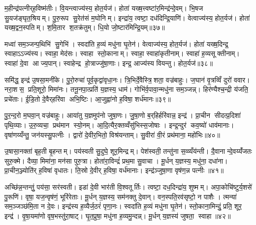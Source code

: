 म॒हीन्द्र॑पत्नीर्‌ह॒विष्म॑तीः। वि॒यन्त्वाज्य॑स्य॒ होत॒र्यज॑। होता॑ यख्ष॒त्त्वष्टा॑र॒मिन्द्र॑न्दे॒वम्। भि॒षज सु॒यज॑ङ्घृत॒श्रियम्। पु॒रु॒रूप सु॒रेत॑सं म॒घोनिम्। इन्द्रा॑य॒ त्वष्टा॒ दध॑दिन्द्रि॒याणि॑। वेत्वाज्य॑स्य॒ होत॒र्यज॑। होता॑ यख्ष॒द्वन॒स्पतिम्। श॒मि॒तार श॒तक्र॑तुम्। धि॒यो जो॒ष्टार॑मिन्द्रि॒यम्॥३७॥

मध्वा॑ सम॒ञ्जन्प॒थिभि॑ सु॒गेभि॑। स्वदा॑ति ह॒व्यं मधु॑ना घृ॒तेन॑। वेत्वाज्य॑स्य॒ होत॒र्यज॑। होता॑ यख्ष॒दिन्द्र॒ स्वाहाऽऽज्य॑स्य। स्वाहा॒ मेद॑सः। स्वाहा स्तो॒कानाम्। स्वाहा॒ स्वाहा॑कृतीनाम्। स्वाहा॑ ह॒व्यसूक्तीनाम्। स्वाहा॑ दे॒वा आज्य॒पान्। स्वाहेन्द्र हो॒त्राज्जु॑षा॒णाः। इन्द्र॒ आज्य॑स्य वियन्तु। होत॒र्यज॑॥३८॥\anuvakamend[तेज॑साऽऽसददवर्धतां॒ भार॑तीन्द्रि॒यञ्जु॑षा॒णा द्वे च॑ (स॒मिधेन्द्र॒न्तनू॒नपा॑त॒मिडा॑भिर्ब॒र्॒हिष्योज॑ उ॒षे दैव्या॑ ति॒स्रस्त्वष्टा॑रं॒ वन॒स्पति॒मिन्द्रम् ॥ स॒मिधेन्द्र॑ञ्च॒तुर्वेत्वेको॑ वि॒यन्तु॒ द्विर्वी॒तामेको॑ वि॒यन्तु॒ द्विर्वेत्वेको॑ वि॒यन्तु॒ होत॒र्यज॑ ॥ )]

समि॑द्ध॒ इन्द्र॑ उ॒षसा॒मनी॑के। पु॒रो॒रुचा॑ पूर्व॒कृद्वा॑वृधा॒नः। त्रि॒भिर्दे॒वैस्त्रि॒शता॒ वज्र॑बाहुः। ज॒घान॑ वृ॒त्रव्विँ दुरो॑ ववार। नरा॒शस॒ प्रति॒शूरो॒ मिमा॑नः। तनू॒नपा॒त्प्रति॑ य॒ज्ञस्य॒ धाम॑। गोभि॑र्व॒पावा॒न्मधु॑ना सम॒ञ्जन्न्। हिर॑ण्यैश्च॒न्द्री य॑जति॒ प्रचे॑ताः। ई॒डि॒तो दे॒वैर्‌हरि॑वा अभि॒ष्टिः। आ॒जुह्वा॑नो ह॒विषा॒ शर्ध॑मानः॥३९॥

पु॒र॒न्द॒रो म॒घवा॒न् वज्र॑बाहुः। आया॑तु य॒ज्ञमुप॑नो जुषा॒णः। जु॒षा॒णो ब॒र्‌हिर्हरि॑वान्न॒ इन्द्र॑। प्रा॒चीन सीदत्प्र॒दिशा॑ पृथि॒व्याः। उ॒रु॒व्यचा॒ प्रथ॑मान स्यो॒नम्। आ॒दि॒त्यैर॒क्तव्वँसु॑भिस्स॒जोषाः। इन्द्र॒न्दुर॑ कव॒ष्यो॑ धाव॑मानाः। वृषा॑णय्यँन्तु॒ जन॑यस्सु॒पत्नीः। द्वारो॑ दे॒वीर॒भितो॒ विश्र॑यन्ताम्। सु॒वीरा॑ वी॒रं प्रथ॑माना॒ महो॑भिः॥४०॥

उ॒षासा॒नक्ता॑ बृह॒ती बृ॒हन्तम्। पय॑स्वती सु॒दुघे॒ शूर॒मिन्द्रम्। पेश॑स्वती॒ तन्तु॑ना स॒व्व्यँय॑न्ती। दै॒वानान्दे॒वय्यँ॑जतः सुरु॒क्मे। दैव्या॒ मिमा॑ना॒ मन॑सा पुरु॒त्रा। होता॑रा॒विन्द्रं॑ प्रथ॒मा सु॒वाचा। मू॒र्धन् य॒ज्ञस्य॒ मधु॑ना॒ दधा॑ना। प्रा॒चीन॒ञ्ज्योति॑र् ह॒विषा॑ वृधातः। ति॒स्रो दे॒वीर्‌ ह॒विषा॒ वर्ध॑मानाः। इन्द्र॑ञ्जुषा॒णा वृष॑ण॒न्न पत्नीः॥४१॥

अच्छि॑न्न॒न्तन्तुं॒ पय॑सा॒ सर॑स्वती। इडा॑ दे॒वी भार॑ती वि॒श्वतूर्तिः। त्वष्टा॒ दध॒दिन्द्रा॑य॒ शुष्मम्। अपा॒कोचि॑ष्टुर्य॒शसे॑ पु॒रूणि॑। वृषा॒ यज॒न्वृष॑णं॒ भूरि॑रेताः। मू॒र्धन् य॒ज्ञस्य॒ सम॑नक्तु दे॒वान्। वन॒स्पति॒रव॑सृष्टो॒ न पाशैः। त्मन्या॑ सम॒ञ्जञ्छ॑मि॒ता न दे॒वः। इन्द्र॑स्य ह॒व्यैर्ज॒ठरं॑ पृणा॒नः। स्वदा॑ति ह॒व्यं मधु॑ना घृ॒तेन॑। स्तो॒काना॒मिन्दुं॒ प्रति॒ शूर॒ इन्द्र॑। वृ॒षा॒यमा॑णो वृष॒भस्तु॑रा॒षाट्। घृ॒त॒प्रुषा॒ मधु॑ना ह॒व्यमु॒न्दन्न्। मू॒र्धन् य॒ज्ञस्य॑ जुषता॒ स्वाहा॥४२॥\anuvakamend[शर्ध॑मानो॒ महो॑भि॒ पत्नीर्घृ॒तेन॑ च॒त्वारि॑ च]

